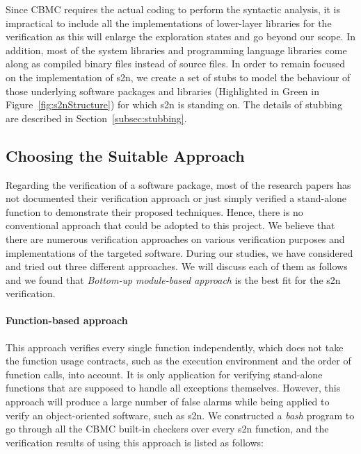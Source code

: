 Since CBMC requires the actual coding to perform the syntactic analysis, it is impractical to include all the implementations of lower-layer libraries for the verification as this will enlarge the exploration states and go beyond our scope. In addition, most of the system libraries and programming language libraries come along as compiled binary files instead of source files. In order to remain focused on the implementation of s2n, we create a set of stubs to model the behaviour of those underlying software packages and libraries (Highlighted in Green in Figure~\ref{fig:s2nStructure}) for which s2n is standing on. The details of stubbing are described in Section~\ref{subsec:stubbing}. 

\subsection{Choosing the Suitable Approach}
Regarding the verification of a software package, most of the research papers has not documented their verification approach or just simply verified a stand-alone function to demonstrate their proposed techniques. Hence, there is no conventional approach that could be adopted to this project. We believe that there are numerous verification approaches on various verification purposes and implementations of the targeted software. During our studies, we have considered and tried out three different approaches. We will discuss each of them as follows and we found that \textit{Bottom-up module-based approach} is the best fit for the s2n verification.

\paragraph{Function-based approach} 
This approach verifies every single function independently, which does not take the function usage contracts, such as the execution environment and the order of function calls, into account. It is only application for verifying stand-alone functions that are supposed to handle all exceptions themselves. However, this approach will produce a large number of false alarms while being applied to verify an object-oriented software, such as s2n. We constructed a \textit{bash} program to go through all the CBMC built-in checkers over every s2n function, and the verification results of using this approach is listed as follows:

